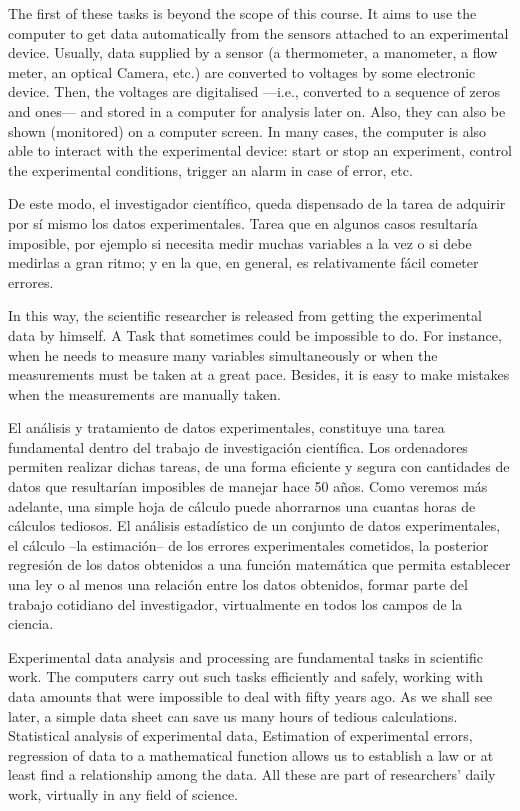 \begin{paracol}{2}
\switchcolumn
The first of these tasks is beyond the scope of this course. It aims to use the computer to get data automatically from the sensors attached to an experimental device. Usually, data supplied by a sensor (a thermometer, a manometer, a flow meter, an optical Camera, etc.) are converted to voltages by some electronic device. Then, the voltages are digitalised ---i.e., converted to a sequence of zeros and ones---  and stored in a computer for analysis later on. Also, they can also be shown (monitored) on a computer screen. In many cases, the computer is also able to interact with the experimental device: start or stop an experiment, control the experimental conditions, trigger an alarm in case of error, etc.          

\switchcolumn
De este modo, el investigador científico, queda dispensado de la tarea de adquirir por sí mismo los datos experimentales. Tarea que en algunos casos resultaría imposible, por ejemplo si necesita medir muchas variables a la vez o si debe medirlas a gran ritmo; y en la que, en general, es relativamente fácil cometer errores.

\switchcolumn
In this way, the scientific researcher is released from getting the experimental data by himself. A Task that sometimes could be impossible to do. For instance, when he needs to measure many variables simultaneously or when the measurements must be taken  at a great pace. Besides, it is easy to make mistakes when the measurements are manually taken.     

\switchcolumn
El análisis y tratamiento de datos experimentales, constituye una tarea fundamental dentro del trabajo de investigación científica. Los ordenadores permiten realizar dichas tareas, de una forma eficiente y segura con cantidades de datos que resultarían imposibles de manejar hace 50 años. Como veremos más adelante, una simple hoja de cálculo puede ahorrarnos una cuantas horas de cálculos tediosos. El análisis estadístico de un conjunto de datos experimentales, el cálculo --la estimación-- de los errores experimentales cometidos, la posterior regresión de los datos obtenidos a una función matemática que permita establecer una ley o al menos una relación entre los datos obtenidos, formar parte del trabajo cotidiano del investigador, virtualmente en todos los campos de la ciencia.

\switchcolumn
Experimental data analysis and processing are fundamental tasks in scientific work. The computers carry out such tasks efficiently and safely, working with data amounts that were impossible to deal with fifty years ago. As we shall see later, a simple data sheet can save us many hours of tedious calculations. Statistical analysis of experimental data, Estimation of experimental errors, regression of data to a mathematical function allows us to establish a law or at least find a relationship among the data. All these are part of researchers' daily work, virtually in any field of science.  
     

\end{paracol}

